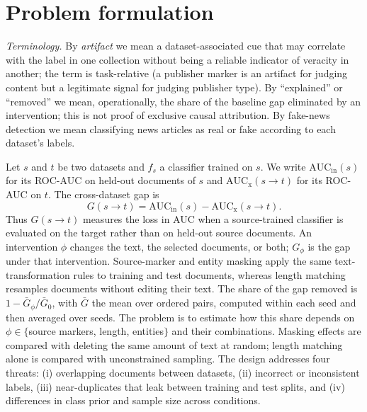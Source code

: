 \section{Problem formulation}
\emph{Terminology.} By \emph{artifact} we mean a dataset-associated cue that may correlate with the label in one collection without being a reliable indicator of veracity in another; the term is task-relative (a publisher marker is an artifact for judging content but a legitimate signal for judging publisher type). By ``explained'' or ``removed'' we mean, operationally, the share of the baseline gap eliminated by an intervention; this is not proof of exclusive causal attribution. By fake-news detection we mean classifying news articles as real or fake according to each dataset's labels.

Let $s$ and $t$ be two datasets and $f_s$ a classifier trained on $s$. We write $\mathrm{AUC}_{\mathrm{in}}(s)$ for its ROC-AUC on held-out documents of $s$ and $\mathrm{AUC}_{\mathrm{x}}(s\!\rightarrow\!t)$ for its ROC-AUC on $t$. The cross-dataset gap is
\begin{equation}
G(s\!\rightarrow\!t)=\mathrm{AUC}_{\mathrm{in}}(s)-\mathrm{AUC}_{\mathrm{x}}(s\!\rightarrow\!t).
\end{equation}
Thus $G(s\!\rightarrow\!t)$ measures the loss in AUC when a source-trained classifier is evaluated on the target rather than on held-out source documents. An intervention $\phi$ changes the text, the selected documents, or both; $G_\phi$ is the gap under that intervention. Source-marker and entity masking apply the same text-transformation rules to training and test documents, whereas length matching resamples documents without editing their text. The share of the gap removed is $1-\bar G_\phi/\bar G_0$, with $\bar G$ the mean over ordered pairs, computed within each seed and then averaged over seeds. The problem is to estimate how this share depends on $\phi\in\{$source markers, length, entities$\}$ and their combinations. Masking effects are compared with deleting the same amount of text at random; length matching alone is compared with unconstrained sampling. The design addresses four threats: (i) overlapping documents between datasets, (ii) incorrect or inconsistent labels, (iii) near-duplicates that leak between training and test splits, and (iv) differences in class prior and sample size across conditions.


